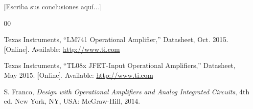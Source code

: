 \documentclass[conference]{IEEEtran}
\begin{document}
[Escriba sus conclusiones aquí...]

\begin{thebibliography}{00}

Texas Instruments, ``LM741 Operational Amplifier,'' Datasheet, Oct. 2015. [Online]. Available: \url{http://www.ti.com}

Texas Instruments, ``TL08x JFET-Input Operational Amplifiers,'' Datasheet, May 2015. [Online]. Available: \url{http://www.ti.com}

S. Franco, \emph{Design with Operational Amplifiers and Analog Integrated Circuits}, 4th ed. New York, NY, USA: McGraw-Hill, 2014.

\end{thebibliography}

% 
% 
\end{document}
